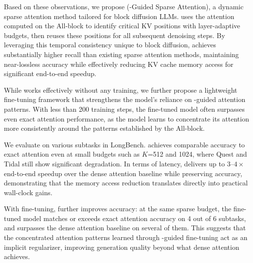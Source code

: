 Based on these observations, we propose \name (\mask-Guided Sparse Attention), a dynamic sparse attention method tailored for block diffusion LLMs. \name uses the attention computed on the All-\mask block to identify critical KV positions with layer-adaptive budgets, then reuses these positions for all subsequent denoising steps. By leveraging this temporal consistency unique to block diffusion, \name achieves substantially higher recall than existing sparse attention methods, maintaining near-lossless accuracy while effectively reducing KV cache memory access for significant end-to-end speedup.

While \name works effectively without any training, we further propose a lightweight fine-tuning framework that strengthens the model's reliance on \mask-guided attention patterns. With less than 200 training steps, the fine-tuned model often surpasses even exact attention performance, as the model learns to concentrate its attention more consistently around the patterns established by the All-\mask block.

We evaluate \name on various subtasks in LongBench. \name achieves comparable accuracy to exact attention even at small budgets such as $K$=512 and 1024, where Quest and Tidal still show significant degradation. In terms of latency, \name delivers up to $3$--$4\times$ end-to-end speedup over the dense attention baseline while preserving accuracy, demonstrating that the memory access reduction translates directly into practical wall-clock gains.

With fine-tuning, \name further improves accuracy: at the same sparse budget, the fine-tuned model matches or exceeds exact attention accuracy on 4 out of 6 subtasks, and surpasses the dense attention baseline on several of them. This suggests that the concentrated attention patterns learned through \mask-guided fine-tuning act as an implicit regularizer, improving generation quality beyond what dense attention achieves.

